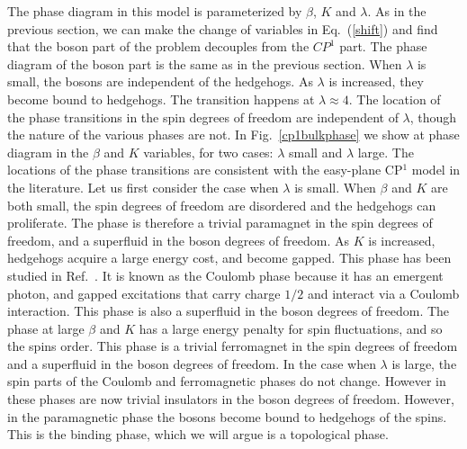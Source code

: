 \documentclass[prb,twocolumn]{revtex4-1}
\begin{document}
The phase diagram in this model is parameterized by $\beta$, $K$ and $\lambda$. As in the previous section, we can make the change of variables in Eq.~(\ref{shift}) and find that the boson part of the problem decouples from the $CP^1$ part. The phase diagram of the boson part is the same as in the previous section. When $\lambda$ is small, the bosons are independent of the hedgehogs. As $\lambda$ is increased, they become bound to hedgehogs. The transition happens at $\lambda\approx 4$. 
The location of the phase transitions in the spin degrees of freedom are independent of $\lambda$, though the nature of the various phases are not. In Fig.~\ref{cp1bulkphase} we show at phase diagram in the $\beta$ and $K$ variables, for two cases: $\lambda$ small and $\lambda$ large. The locations of the phase transitions are consistent with the easy-plane CP$^1$ model in the literature.\cite{LesikSenthil} 
Let us first consider the case when $\lambda$ is small. When $\beta$ and $K$ are both small, the spin degrees of freedom are disordered and the hedgehogs can proliferate. The phase is therefore a trivial paramagnet in the spin degrees of freedom, and a superfluid in the boson degrees of freedom. 
As $K$ is increased, hedgehogs acquire a large energy cost, and become gapped. This phase has been studied in Ref.~. It is known as the Coulomb phase because it has an emergent photon, and gapped excitations that carry charge $1/2$ and interact via a Coulomb interaction. This phase is also a superfluid in the boson degrees of freedom. 
The phase at large $\beta$ and $K$ has a large energy penalty for spin fluctuations, and so the spins order. This phase is a trivial ferromagnet in the spin degrees of freedom and a superfluid in the boson degrees of freedom. In the case when $\lambda$ is large, the spin parts of the Coulomb and ferromagnetic phases do not change. However in these phases are now trivial insulators in the boson degrees of freedom. However, in the paramagnetic phase the bosons become bound to hedgehogs of the spins. This is the binding phase, which we will argue is a topological phase.
 
\end{document}
